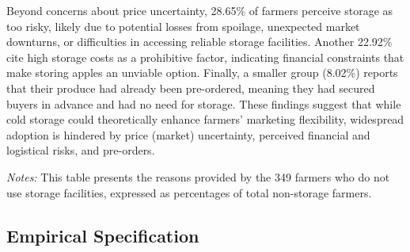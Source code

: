 \documentclass[12pt]{article}
\begin{document}
Beyond concerns about price uncertainty, 28.65\% of farmers perceive storage as too risky, likely due to potential losses from spoilage, unexpected market downturns, or difficulties in accessing reliable storage facilities. Another 22.92\% cite high storage costs as a prohibitive factor, indicating financial constraints that make storing apples an unviable option. Finally, a smaller group (8.02\%) reports that their produce had already been pre-ordered, meaning they had secured buyers in advance and had no need for storage. These findings suggest that while cold storage could theoretically enhance farmers' marketing flexibility, widespread adoption is hindered by price (market) uncertainty, perceived financial and logistical risks, and pre-orders.

\begin{table}[H]
    \centering
    \footnotesize
    \caption{Reasons for Not Using Storage Facilities}
    \label{tab:non_storage_reasons}
        \begin{tablenotes}
            \item \textit{Notes:} This table presents the reasons provided by the 349 farmers who do not use storage facilities, expressed as percentages of total non-storage farmers.
        \end{tablenotes}
\end{table}


\newpage
\subsection{Empirical Specification}
\end{document}
